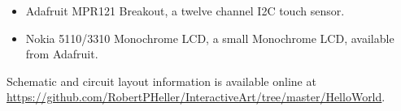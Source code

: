 \begin{itemize}
\item Adafruit MPR121 Breakout, a twelve channel I2C touch sensor.
\item Nokia 5110/3310 Monochrome LCD, a small Monochrome LCD, available from 
Adafruit.
\end{itemize}

Schematic and circuit layout information is available online at 
\url{https://github.com/RobertPHeller/InteractiveArt/tree/master/HelloWorld}.


